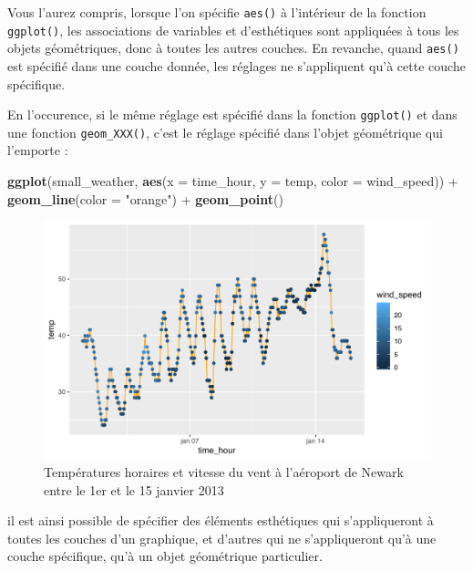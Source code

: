 \documentclass[a4paperpaper,]{article}
\newenvironment{Shaded}{\begin{snugshade}}{\end{snugshade}}
\newcommand{\DataTypeTok}[1]{\textcolor[rgb]{0.00,0.34,0.68}{#1}}
\newcommand{\KeywordTok}[1]{\textcolor[rgb]{0.12,0.11,0.11}{\textbf{#1}}}
\newcommand{\NormalTok}[1]{\textcolor[rgb]{0.12,0.11,0.11}{#1}}
\newcommand{\OperatorTok}[1]{\textcolor[rgb]{0.12,0.11,0.11}{#1}}
\newcommand{\StringTok}[1]{\textcolor[rgb]{0.75,0.01,0.01}{#1}}
\theoremstyle{definition}
\theoremstyle{definition}
\theoremstyle{definition}
\theoremstyle{remark}
\begin{document}
Vous l'aurez compris, lorsque l'on spécifie \texttt{aes()} à l'intérieur
de la fonction \texttt{ggplot()}, les associations de variables et
d'esthétiques sont appliquées à tous les objets géométriques, donc à
toutes les autres couches. En revanche, quand \texttt{aes()} est
spécifié dans une couche donnée, les réglages ne s'appliquent qu'à cette
couche spécifique.

En l'occurence, si le même réglage est spécifié dans la fonction
\texttt{ggplot()} et dans une fonction \texttt{geom\_XXX()}, c'est le
réglage spécifié dans l'objet géométrique qui l'emporte :

\begin{Shaded}
\begin{Highlighting}[]
\KeywordTok{ggplot}\NormalTok{(small_weather, }\KeywordTok{aes}\NormalTok{(}\DataTypeTok{x =}\NormalTok{ time_hour, }\DataTypeTok{y =}\NormalTok{ temp, }\DataTypeTok{color =}\NormalTok{ wind_speed)) }\OperatorTok{+}
\StringTok{  }\KeywordTok{geom_line}\NormalTok{(}\DataTypeTok{color =} \StringTok{"orange"}\NormalTok{) }\OperatorTok{+}
\StringTok{  }\KeywordTok{geom_point}\NormalTok{()}
\end{Highlighting}
\end{Shaded}

\begin{figure}[htpb]

{\centering \includegraphics[width=0.9\linewidth]{figure/wind4-1} 

}

\caption{Températures horaires et vitesse du vent à l'aéroport de Newark entre le 1er et le 15 janvier 2013}\label{fig:wind4}
\end{figure}

il est ainsi possible de spécifier des éléments esthétiques qui
s'appliqueront à toutes les couches d'un graphique, et d'autres qui ne
s'appliqueront qu'à une couche spécifique, qu'à un objet géométrique
particulier.
\end{document}
